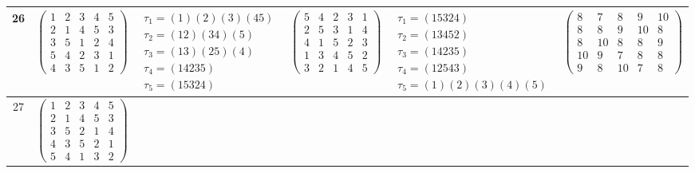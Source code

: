 \begin{longtable}{|c|p{2.7cm}|p{2.7cm}|p{2.7cm}|p{2.7cm}|p{3.3cm}|}
    \hline
    26                                                                                                                                          &
    $\begin{pmatrix}1&2&3&4&5\\2&1&4&5&3\\3&5&1&2&4\\5&4&2&3&1\\4&3&5&1&2\end{pmatrix}$                                                         &
    $\begin{array}{l}\tau_{1}=(1)(2)(3)(45)\\ \tau_{2}=(12)(34)(5)\\ \tau_{3}=(13)(25)(4)\\ \tau_{4}=(14235)\\ \tau_{5}=(15324)\end{array}$     &
    $\begin{pmatrix}5&4&2&3&1\\2&5&3&1&4\\4&1&5&2&3\\1&3&4&5&2\\3&2&1&4&5\end{pmatrix}$                                                         &
    $\begin{array}{l}\tau_{1}=(15324)\\ \tau_{2}=(13452)\\ \tau_{3}=(14235)\\ \tau_{4}=(12543)\\ \tau_{5}=(1)(2)(3)(4)(5)\end{array}$           &
    $\begin{pmatrix}8&7&8&9&10\\8&8&9&10&8\\8&10&8&8&9\\10&9&7&8&8\\9&8&10&7&8\end{pmatrix}$                                                                                                                                \\
    \hline
    27                                                                                                                                          &
    $\begin{pmatrix}1&2&3&4&5\\2&1&4&5&3\\3&5&2&1&4\\4&3&5&2&1\\5&4&1&3&2\end{pmatrix}$                                                         &

\end{longtable}
